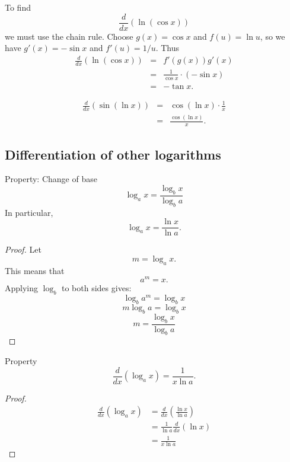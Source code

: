\begin{example}
To find $$\frac{d}{dx}\left(\ln (\cos x)\right)$$ we must use the chain rule.
Choose $g(x)=\cos x$ and $f(u)=\ln u$, so we have $g'(x)=-\sin x$ and $f'(u)=1/u$. Thus
\begin{eqnarray*}
\frac{d}{dx}(\ln (\cos x)) &=& f'(g(x))g'(x) \\
&=& \frac{1}{\cos x}\cdot (-\sin x) \\
&=& -\tan x.
\end{eqnarray*}
\end{example}
\begin{example}
\begin{eqnarray*}
\frac{d}{dx}(\sin(\ln x)) &=& \cos (\ln x)\cdot\frac{1}{x} \\
&=& \frac{\cos(\ln x)}{x}.
\end{eqnarray*}
\end{example}


\subsection{Differentiation of other logarithms}
\begin{thing}{Property: Change of base}
\[\log_ax=\frac{\log_bx}{\log_ba}\]
In particular, \[\log_ax=\frac{\ln x}{\ln a}.\]
\begin{proof}
Let $$m=\log_ax.$$ This means that $$a^m=x.$$
Applying $\log_b$ to both sides gives:
$$\log_ba^m=\log_bx$$
$$m\log_ba=\log_bx$$
$$m=\frac{\log_bx}{\log_ba}$$

\end{proof}
\end{thing}
\begin{thing}{Property}
\[\frac{d}{dx}\left( \log_ax\right)=\frac{1}{x\ln a}.\]
\begin{proof}
\begin{align*}
\frac{d}{dx}\left(\log_ax\right)
&=\frac{d}{dx}\left(\frac{\ln x}{\ln a}\right)\\
&=\frac{1}{\ln a}\frac{d}{dx}\left(\ln x\right)\\
&=\frac{1}{x\ln a}
\end{align*}

\end{proof}
\end{thing}



